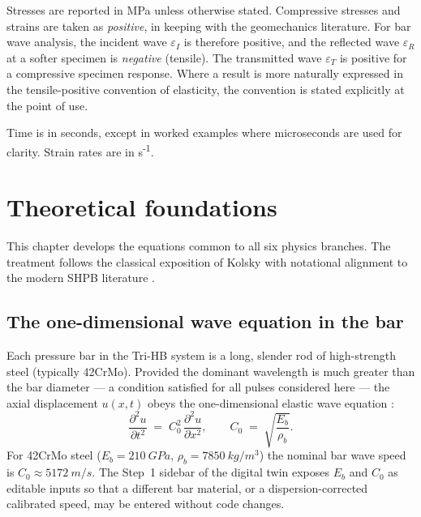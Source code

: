 \documentclass[11pt,a4paper,openany]{book}
\providecommand{\SI}[2]{\qty{#1}{#2}}
\theoremstyle{handbook}
\newcommand{\eps}{\varepsilon}
\newcommand{\Cz}{C_0}
\begin{document}
Stresses are reported in MPa unless otherwise stated. Compressive stresses
and strains are taken as \emph{positive}, in keeping with the geomechanics
literature. For bar wave analysis, the incident wave $\eps_I$ is therefore
positive, and the reflected wave $\eps_R$ at a softer specimen is
\emph{negative} (tensile). The transmitted wave $\eps_T$ is positive for a
compressive specimen response. Where a result is more naturally expressed in
the tensile-positive convention of elasticity, the convention is stated
explicitly at the point of use.

Time is in seconds, except in worked examples where microseconds are used for
clarity. Strain rates are in s\textsuperscript{-1}.

\chapter{Theoretical foundations}\label{ch:foundations}

This chapter develops the equations common to all six physics branches. The
treatment follows the classical exposition of Kolsky \cite{Kolsky1949,Kolsky1963}
with notational alignment to the modern SHPB literature
\cite{ChenSong2011,GrayHandbook}.

\section{The one-dimensional wave equation in the bar}\label{sec:wave-eq}

Each pressure bar in the Tri-HB system is a long, slender rod of high-strength
steel (typically 42CrMo). Provided the dominant wavelength is much greater
than the bar diameter --- a condition satisfied for all pulses considered here
--- the axial displacement $u(x,t)$ obeys the one-dimensional elastic wave
equation \cite{Graff1975}:
\begin{equation}
  \frac{\partial^{2}u}{\partial t^{2}} \;=\; \Cz^{2}\,\frac{\partial^{2}u}{\partial x^{2}},
  \qquad
  \Cz \;=\; \sqrt{\frac{E_b}{\rho_b}} .
  \label{eq:wave-eq}
\end{equation}
For 42CrMo steel ($E_b = \SI{210}{GPa}$, $\rho_b = \SI{7850}{kg/m^{3}}$) the
nominal bar wave speed is $\Cz \approx \SI{5172}{m/s}$. The Step~1 sidebar of
the digital twin exposes $E_b$ and $\Cz$ as editable inputs so that a
different bar material, or a dispersion-corrected calibrated speed, may be
entered without code changes.
\end{document}
